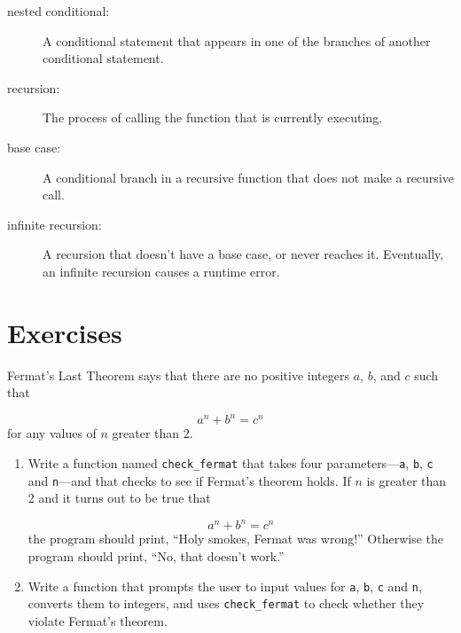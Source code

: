 \documentclass[10pt]{book}
\begin{document}
\begin{description}
\item[nested conditional:]  A conditional statement that appears
in one of the branches of another conditional statement.

\item[recursion:]  The process of calling the function that is
currently executing.

\item[base case:]  A conditional branch in a
recursive function that does not make a recursive call.

\item[infinite recursion:]  A recursion that doesn't have a
base case, or never reaches it.  Eventually, an infinite recursion
causes a runtime error.

\end{description}

\section{Exercises}

\begin{exercise}

Fermat's Last Theorem says that there are no positive integers
$a$, $b$, and $c$ such that

\[ a^n + b^n = c^n \]
%
for any values of $n$ greater than 2.

\begin{enumerate}

\item Write a function named \verb"check_fermat" that takes four
parameters---{\tt a}, {\tt b}, {\tt c} and {\tt n}---and
that checks to see if Fermat's theorem holds.  If
$n$ is greater than 2 and it turns out to be true that 

\[a^n + b^n = c^n \]
%
the program should print, ``Holy smokes, Fermat was wrong!''
Otherwise the program should print, ``No, that doesn't work.''

\item Write a function that prompts the user to input values
for {\tt a}, {\tt b}, {\tt c} and {\tt n}, converts them to
integers, and uses \verb"check_fermat" to check whether they
violate Fermat's theorem.

\end{enumerate}

\end{exercise}
\end{document}
